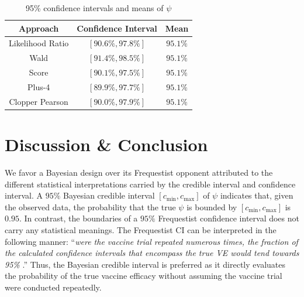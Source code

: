 \documentclass[12pt]{amsart}
\begin{document}
\singlespacing
\begin{table}[H]
  \label{Tab: 2}
  \setlength{\tabcolsep}{10pt} %
\renewcommand{\arraystretch}{1.1}
  \begin{center}
    \begin{tabular}{ c c c }
     Approach & Confidence Interval & Mean \\ \hline
     Likelihood Ratio & $[90.6\%, 97.8\%]$ & $95.1\%$ \\  
     Wald & $[91.4\%, 98.5\%]$ & $95.1\%$ \\ 
     Score &  $[90.1\%, 97.5\%]$ & $95.1\%$ \\
     Plus-4 & $[89.9\%, 97.7\%]$ & $95.1\%$\\
     Clopper Pearson & $[90.0\%, 97.9\%]$ & $95.1\%$ \\ \hline
    \end{tabular}
    \vspace{2pt}
    \caption{95\% confidence intervals and means of $\psi$} \label{table:2}
  \end{center}
\end{table}
\doublespacing
\section{Discussion \& Conclusion}

We favor a Bayesian design over its Frequestist opponent attributed to the different statistical interpretations carried by the credible interval and confidence interval. A $95\%$ Bayesian credible interval $[c_{\min}, c_{\max}]$ of $\psi$ indicates that, given the observed data, the probability that the true $\psi$ is bounded by $[c_{\min}, c_{\max}]$ is $0.95$. In contrast, the boundaries of a $95\%$ Frequestist confidence interval does not carry any statistical meanings. The Frequestist CI can be interpreted in the following manner: ``\textit{were the vaccine trial repeated numerous times, the fraction of the calculated confidence intervals that encompass the true VE would tend towards 95\%} \citep{cox}.'' Thus, the Bayesian credible interval is preferred as it directly evaluates the probability of the true vaccine efficacy without assuming the vaccine trial were conducted repeatedly. 

\end{document}
